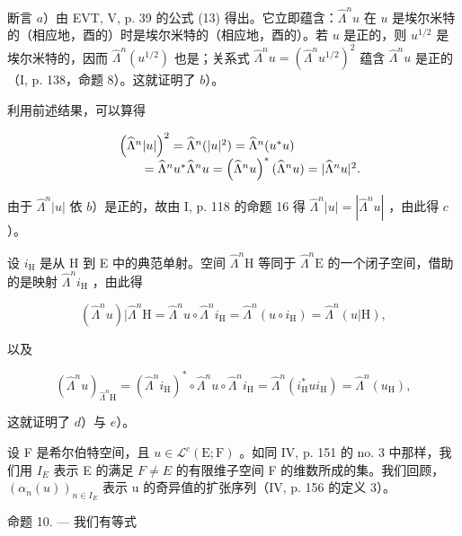 断言 \(a\)）由 EVT, V, p. 39 的公式 (13) 得出。它立即蕴含：\(\widehat{\Lambda}^{n}u\) 在 \(u\) 是埃尔米特的（相应地，酉的）时是埃尔米特的（相应地，酉的）。若 \(u\) 是正的，则 \(u^{1/2}\) 是埃尔米特的，因而 \(\widehat{\Lambda}^{n}(u^{1/2})\) 也是；关系式 \(\widehat{\Lambda}^{n}u = (\widehat{\Lambda}^{n}u^{1/2})^{2}\) 蕴含 \(\widehat{\Lambda}^{n}u\) 是正的（I, p. 138，命题 8）。这就证明了 \(b\)）。

利用前述结果，可以算得

\[
\begin{array}{r l} & {\left(\widehat {\Lambda} ^ {n} | u |\right) ^ {2} = \widehat {\Lambda} ^ {n} (| u | ^ {2}) = \widehat {\Lambda} ^ {n} (u ^ {*} u)} \\ & {\qquad = \widehat {\Lambda} ^ {n} u ^ {*} \widehat {\Lambda} ^ {n} u = \left(\widehat {\Lambda} ^ {n} u\right) ^ {*} (\widehat {\Lambda} ^ {n} u) = | \widehat {\Lambda} ^ {n} u | ^ {2}.} \end{array}
\]

由于 \(\widehat{\Lambda}^n |u|\) 依 \(b\)）是正的，故由 I, p. 118 的命题 16 得 \(\widehat{\Lambda}^n |u| = |\widehat{\Lambda}^n u|\) ，由此得 \(c\)）。

设 \(i_{\mathrm{H}}\) 是从 H 到 E 中的典范单射。空间 \(\widehat{\Lambda}^{n}\mathrm{H}\) 等同于 \(\widehat{\Lambda}^{n}\mathrm{E}\) 的一个闭子空间，借助的是映射 \(\widehat{\Lambda}^{n}i_{\mathrm{H}}\) ，由此得

\[
(\widehat {\Lambda} ^ {n} u) | \widehat {\Lambda} ^ {n} \mathrm{H} = \widehat {\Lambda} ^ {n} u \circ \widehat {\Lambda} ^ {n} i _ {\mathrm{H}} = \widehat {\Lambda} ^ {n} (u \circ i _ {\mathrm{H}}) = \widehat {\Lambda} ^ {n} (u | \mathrm{H}),
\]

以及

\[
(\widehat {\Lambda} ^ {n} u) _ {\widehat {\Lambda} ^ {n} \mathrm{H}} = (\widehat {\Lambda} ^ {n} i _ {\mathrm{H}}) ^ {*} \circ \widehat {\Lambda} ^ {n} u \circ \widehat {\Lambda} ^ {n} i _ {\mathrm{H}} = \widehat {\Lambda} ^ {n} (i _ {\mathrm{H}} ^ {*} u i _ {\mathrm{H}}) = \widehat {\Lambda} ^ {n} (u _ {\mathrm{H}}),
\]

这就证明了 \(d\)）与 \(e\)）。

设 F 是希尔伯特空间，且 \(u \in \mathcal{L}^{c}(\mathrm{E};\mathrm{F})\) 。如同 IV, p. 151 的 no. 3 中那样，我们用 \(I_{E}\) 表示 E 的满足 \(F \neq E\) 的有限维子空间 F 的维数所成的集。我们回顾，\((\alpha_{n}(u))_{n \in I_{E}}\) 表示 u 的奇异值的扩张序列（IV, p. 156 的定义 3）。

命题 10. --- 我们有等式

